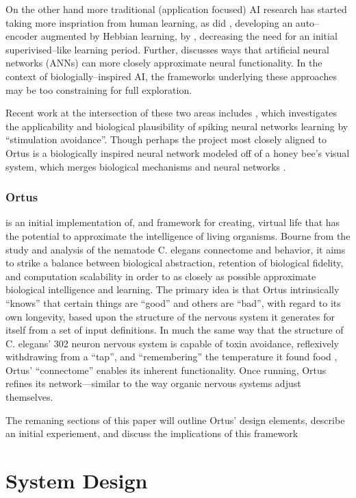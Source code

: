\documentclass[letterpaper]{article}
\begin{document}
On the other hand more traditional (application focused) AI research has started taking more inspriation from human learning, as did \citet{Bowren2016}, developing an auto--encoder augmented by Hebbian learning, by \citet{Bowren2016}, decreasing the need for an initial superivised--like learning period. Further, \cite{Marblestone2016} discusses ways that artificial neural networks (ANNs) can more closely approximate neural functionality.
In the context of biologially--inspired AI, the frameworks underlying these approaches may be too constraining for full exploration. 

Recent work at the intersection of these two areas includes \citet{Sinapayen2016}, which investigates the applicability and biological plausibility of spiking neural networks learning by ``stimulation avoidance''. Though perhaps the project most closely aligned to Ortus is a biologically inspired neural network modeled off of a honey bee's visual system, which merges biological mechanisms and neural networks \citet{Roper2017}.


\subsubsection{Ortus} is an initial implementation of, and framework for creating, virtual life that has the potential to approximate the intelligence of living organisms.
Bourne from the study and analysis of the nematode C. elegans connectome and behavior, it aims to strike a balance between biological abstraction, retention of biological fidelity, and computation scalability in order to as closely as possible approximate biological intelligence and learning.
The primary idea is that Ortus intrinsically ``knows'' that certain things are ``good'' and others are ``bad'', with regard to its own longevity, based upon the structure of the nervous system it generates for itself from a set of input definitions.
In much the same way that the structure of C. elegans' 302 neuron nervous system is capable of toxin avoidance, reflexively withdrawing from a ``tap'', and ``remembering'' the temperature it found food  \citep{Jarrell2012}, Ortus' ``connectome'' enables its inherent functionality.
Once running, Ortus refines its network---similar to the way organic nervous systems adjust themselves.

The remaning sections of this paper will outline Ortus' design elements, describe an initial experiement, and discuss the implications of this framework 

\section{System Design}
\end{document}
